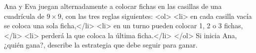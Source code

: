 Ana y Eva juegan alternadamente a colocar fichas en las casillas de una cuadrícula de $9 \times  9$, con las tres reglas siguientes:
<ol>
<li> en cada casilla vacía se coloca una sola ficha,</li>
<li> en un turno pueden colocar 1, 2 o 3 fichas,</li>
<li> perderá la que coloca la última ficha.</li>
</ol>
Si inicia Ana, ¿quién gana?, describe la estrategia que debe seguir para ganar.